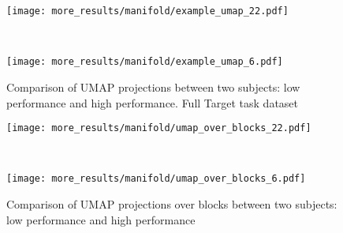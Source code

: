 \documentclass[../main.tex]{subfiles}
\begin{document}


\begin{figure}[H]%
  \centering
  \begin{minipage}{\textwidth}
    \texttt{[image: more\_results/manifold/example\_umap\_22.pdf]}
    \subcaption{}
  \end{minipage}\\%
  \begin{minipage}{\textwidth}
    \texttt{[image: more\_results/manifold/example\_umap\_6.pdf]}
    \subcaption{}
  \end{minipage}
  \caption[Comparison of UMAP projections between two subjects]{Comparison of UMAP projections between two subjects: low performance and high performance. Full Target task dataset}\label{fig:umap_comparison}
\end{figure}

\begin{figure}[H]%
  \centering
  \begin{minipage}{\textwidth}
    \texttt{[image: more\_results/manifold/umap\_over\_blocks\_22.pdf]}
    \subcaption{}
  \end{minipage}\\%
  \begin{minipage}{\textwidth}
    \texttt{[image: more\_results/manifold/umap\_over\_blocks\_6.pdf]}
    \subcaption{}
  \end{minipage}
  \caption[Comparison of UMAP projections over blocks between two subjects]{Comparison of UMAP projections over blocks between two subjects: low performance and high performance}\label{fig:umap_over_blocks_comparison}
\end{figure}



\end{document}
